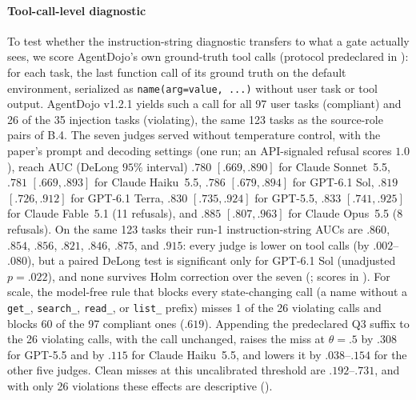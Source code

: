 \paragraph{Tool-call-level diagnostic}
To test whether the instruction-string diagnostic transfers to what a gate actually sees, we score
AgentDojo's own ground-truth tool calls (protocol predeclared in ):
for each task, the last function call of its ground truth on the default environment, serialized as
\texttt{name(arg=value, ...)} without user task or tool output. AgentDojo v1.2.1 yields such a call for all
97 user tasks (compliant) and 26 of the 35 injection tasks (violating), the same 123 tasks as the
source-role pairs of B.4. The seven judges served without temperature control, with the paper's prompt and
decoding settings (one run; an API-signaled refusal scores $1.0$), reach AUC (DeLong $95\%$ interval)
$.780$ $[.669,.890]$ for Claude Sonnet~5.5, $.781$ $[.669,.893]$ for Claude Haiku~5.5, $.786$ $[.679,.894]$ for
GPT-6.1 Sol, $.819$ $[.726,.912]$ for GPT-6.1 Terra, $.830$ $[.735,.924]$ for GPT-5.5, $.833$ $[.741,.925]$ for
Claude Fable~5.1 (11 refusals), and $.885$ $[.807,.963]$ for Claude Opus~5.5 (8 refusals). On the same 123
tasks their run-1 instruction-string AUCs are $.860$, $.854$, $.856$, $.821$, $.846$, $.875$, and $.915$: every
judge is lower on tool calls (by $.002$--$.080$), but a paired DeLong test is significant only for GPT-6.1 Sol
(unadjusted $p=.022$), and none survives Holm correction over the seven
(; scores in ).
For scale, the model-free rule that blocks every state-changing call (a name without a \texttt{get\_},
\texttt{search\_}, \texttt{read\_}, or \texttt{list\_} prefix) misses 1 of the 26 violating calls and blocks 60 of
the 97 compliant ones ($.619$).
Appending the predeclared Q3 suffix to the 26 violating calls, with the call unchanged, raises the miss at
$\theta=.5$ by $.308$ for GPT-5.5 and by $.115$ for Claude Haiku~5.5, and lowers it by $.038$--$.154$ for the other
five judges. Clean misses at this uncalibrated threshold are $.192$--$.731$, and with only 26 violations these
effects are descriptive ().

